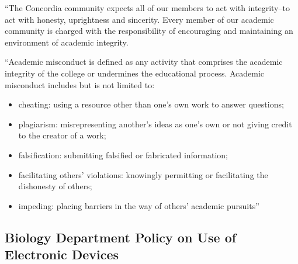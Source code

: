 \documentclass{tufte-handout}
\begin{document}
``The Concordia community expects all of our members to act with integrity--to act with honesty, uprightness and sincerity. Every member of our academic community is charged with the responsibility of encouraging and maintaining an environment of academic integrity.



``Academic misconduct is defined as any activity that comprises the academic integrity of the college or undermines the educational process. Academic misconduct includes but is not limited to:

\begin{itemize}
	\item cheating: using a resource other than one's own work to answer questions;
	\item plagiarism: misrepresenting another's ideas as one's own or not giving credit to the creator of a work;
	\item falsification: submitting falsified or fabricated information;
	\item facilitating others' violations: knowingly permitting or facilitating the dishonesty of others;
	\item impeding: placing barriers in the way of others' academic pursuits''
\end{itemize}



\subsection{Biology Department Policy on Use of Electronic Devices}
\end{document}
